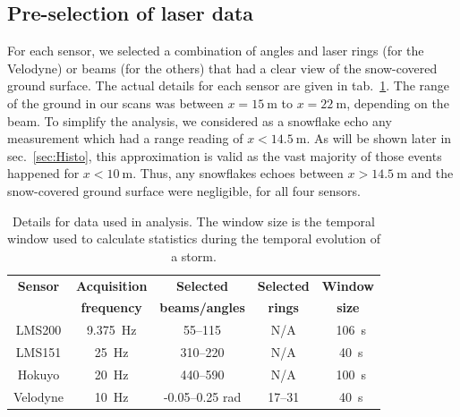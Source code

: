 \subsection{Pre-selection of laser data}
For each sensor, we selected a combination of angles and laser rings (for the Velodyne) or beams (for the others) that had a clear view of the snow-covered ground surface. The actual details for each sensor are given in tab.~\ref{tab:selectionScans}. The range of the ground in our scans was between $x = \SI{15}{\meter}$ to $x=\SI{22}{\meter}$, depending on the beam. To simplify the analysis, we considered as a snowflake echo any measurement which had a range reading of $x<\SI{14.5}{\meter}$. As will be shown later in sec.~\ref{sec:Histo}, this approximation is valid as the vast majority of those events happened for $x<\SI{10}{\meter}$. Thus, any snowflakes echoes between $x>\SI{14.5}{\meter}$ and the snow-covered ground surface were negligible, for all four sensors.

\begin{table}[htbp]
    \centering
    \begin{tabular}{|c|c|c|c|c|}
        \hline
        \textbf{Sensor}            & \textbf{Acquisition}  & \textbf{Selected}  & \textbf{Selected}  & \textbf{Window} \\
        \textbf{ }                     & \textbf{frequency}  & \textbf{beams/angles}  & \textbf{rings}  & \textbf{size} \\\hline
       LMS200               & \SI{9.375}{\Hz}                      & 55--115                                    & N/A                         & ~\SI{106}{\second}       \\\hline
        LMS151               & \SI{25}{\Hz}                           & 310--220                                  & N/A                         & ~\SI{40}{\second}        \\\hline
        Hokuyo               & \SI{20}{\Hz}                          & 440--590                                  & N/A                         & ~\SI{100}{\second}     \\\hline
        Velodyne             & \SI{10}{\Hz}                          & -0.05--0.25 rad                     & 17--31                   & ~\SI{40}{\second}      \\\hline
    \end{tabular}
    \caption{Details for data used in analysis. The window size is the temporal window used to calculate statistics during the temporal evolution of a storm.}
    \label{tab:selectionScans}
\end{table}

